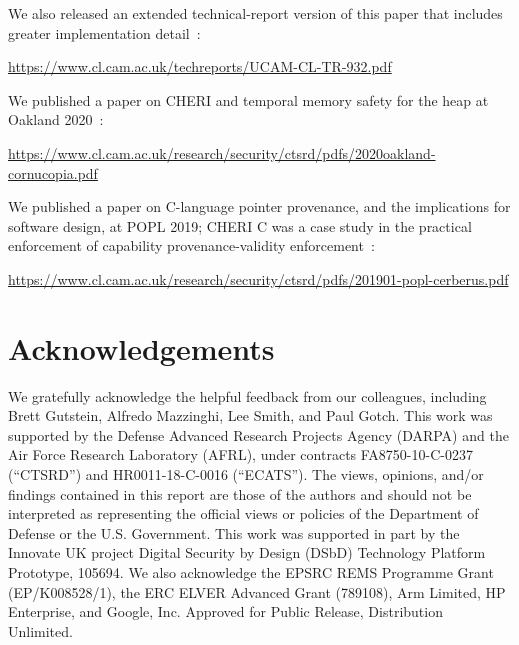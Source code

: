 \documentclass[12pt,twoside,openright,usletter]{article}
\begin{document}
\noindent
We also released an extended technical-report version of this paper that
includes greater implementation detail~\cite{UCAM-CL-TR-932}:

\smallskip
\noindent
\url{https://www.cl.cam.ac.uk/techreports/UCAM-CL-TR-932.pdf}
\smallskip

\noindent
We published a paper on CHERI and temporal memory safety for the heap at
Oakland 2020~\cite{filardo:cornucopia}:

\smallskip
\noindent
\url{https://www.cl.cam.ac.uk/research/security/ctsrd/pdfs/2020oakland-cornucopia.pdf}
\smallskip

\noindent
We published a paper on C-language pointer provenance, and the implications
for software design, at POPL 2019; CHERI C was a case study in the practical
enforcement of capability provenance-validity
enforcement~\cite{cerberus-popl2019}:

\smallskip
\noindent
\url{https://www.cl.cam.ac.uk/research/security/ctsrd/pdfs/201901-popl-cerberus.pdf}
\smallskip


\section{Acknowledgements}

We gratefully acknowledge the helpful feedback from our colleagues, including
Brett Gutstein, Alfredo Mazzinghi, Lee Smith, and Paul Gotch.
This work was supported by the Defense Advanced Research Projects Agency (DARPA) and the Air Force Research Laboratory (AFRL), under contracts
FA8750-10-C-0237 (``CTSRD'') and HR0011-18-C-0016 (``ECATS'').
The views, opinions, and/or findings contained in this report are those of the authors and should not be interpreted as representing the official views or policies of the Department of Defense or the U.S. Government.
This work was supported in part by the Innovate UK project Digital Security by
Design (DSbD) Technology Platform Prototype, 105694.
We also acknowledge the EPSRC REMS Programme Grant (EP/K008528/1), the
ERC ELVER Advanced Grant (789108), Arm Limited,
HP Enterprise, and Google, Inc.
Approved for Public Release, Distribution Unlimited.

\printbibliography
\end{document}
